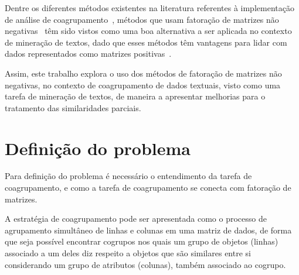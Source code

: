 \documentclass[
    12pt,                %
    oneside,            %
    a4paper,            %
    english,            %
    brazil                %
    ]{abntex2ppgsi}
\begin{document}
Dentre os diferentes métodos existentes na literatura referentes à implementação de análise de coagrupamento~\cite{Franca2010,Mirkin1996,Madeira2004}, métodos que usam fatoração de matrizes não negativas~\cite{lee:nnmf00,lee99} têm sido vistos como uma boa alternativa a ser aplicada no contexto de mineração de textos, dado que esses métodos têm vantagens para lidar com dados representados como matrizes positivas~\cite{Xu2003,Shahnaz2006373,Yoo2010}.

Assim, este trabalho explora o uso dos métodos de fatoração de matrizes não negativas, no contexto de coagrupamento de dados textuais, visto como uma tarefa de mineração de textos, de maneira a apresentar melhorias para o tratamento das similaridades parciais.


\section{Definição do problema}




Para definição do problema é necessário o entendimento da tarefa de coagrupamento, e como a tarefa de coagrupamento se conecta com fatoração de matrizes.

A estratégia de coagrupamento pode ser apresentada como o processo de agrupamento simultâneo de linhas e colunas em uma matriz de dados, de forma que seja possível encontrar cogrupos nos quais um grupo de objetos (linhas) associado a um deles diz respeito a objetos que são similares entre si considerando um grupo de atributos (colunas), também associado ao cogrupo.
\end{document}
